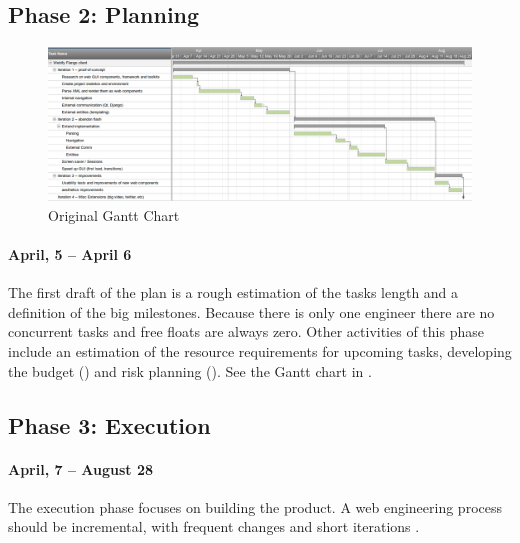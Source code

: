 \subsection{Phase 2: Planning}
\begin{figure}   
    \centering
    \includegraphics[width=\textwidth]{figures/plan-gantt-orig}
    \caption{Original Gantt Chart}
    \label{fig:plan-gantt-orig}
\end{figure}

\paragraph{April, 5 -- April 6}
The first draft of the plan is a rough estimation of the tasks length and a definition of the big milestones.
Because there is only one engineer there are no concurrent tasks and free floats are always zero.
Other activities of this phase include an estimation of the resource requirements for upcoming tasks, developing the budget () and risk planning ().
See the Gantt chart in .

\subsection{Phase 3: Execution}
\paragraph{April, 7 -- August 28}
The execution phase focuses on building the product. 
A web engineering process should be incremental, with frequent changes and short iterations \cite{Kappel:2006}.

